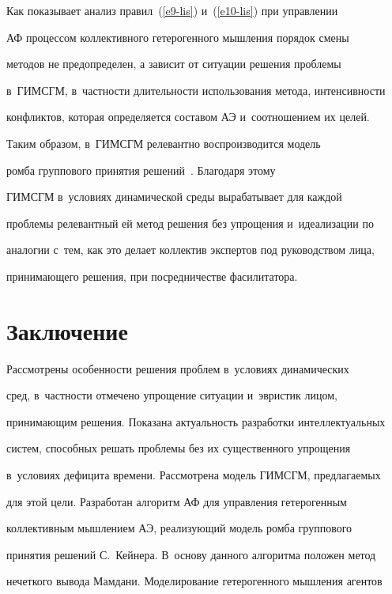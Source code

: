   


  Как показывает анализ правил~(\ref{e9-lis}) и~(\ref{e10-lis}) при управлении 


АФ процессом коллективного гетерогенного мышления порядок смены 


методов не предопределен, а зависит от ситуации решения проблемы 


в~ГИМСГМ, в~частности длительности использования метода, интенсивности 


конфликтов, которая определяется составом АЭ и~соотношением их целей. 


Таким образом, в~\mbox{ГИМСГМ} релевантно воспроизводится модель 


ромба группового принятия решений~\cite{10-lis}. Благодаря этому 


\mbox{ГИМСГМ} в~условиях динамической среды вырабатывает для каждой 


проб\-ле\-мы релевантный ей метод решения без упрощения и~идеализации по 


аналогии с~тем, как это делает коллектив экспертов под руководством лица, 


принимающего решения, при посредничестве фасилитатора. 


  


\section{Заключение}





  Рассмотрены особенности решения проблем в~условиях динамических 


сред, в~частности отмечено упрощение ситуации и~эвристик лицом, 


принимающим решения. Показана актуальность разработки интеллектуальных 


систем, способных решать проблемы без их существенного упрощения 


в~условиях дефицита времени. Рассмотрена модель ГИМСГМ, предлагаемых 


для этой цели. Разработан алгоритм АФ для управления гетерогенным 


коллективным мышлением АЭ, реализующий модель ромба группового 


принятия решений С.~Кейнера. В~основу данного алгоритма положен метод 


нечеткого вывода Мамдани. Моделирование гетерогенного мышления агентов 


